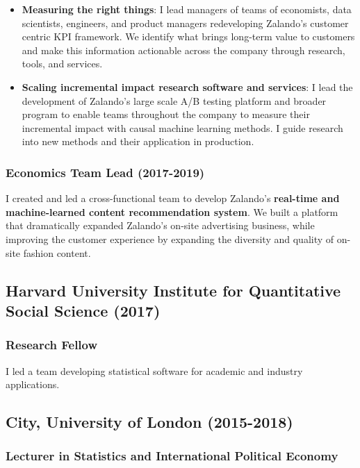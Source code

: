 \documentclass[a4paper]{article}
\begin{document}
\begin{itemize}

  \item \textbf{Measuring the right things}: I lead managers of teams of economists, data scientists, engineers, and product managers redeveloping Zalando's customer centric KPI framework. We identify what brings long-term value to customers and make this information actionable across the company through research, tools, and services.

  \item \textbf{Scaling incremental impact research software and services}: I lead the development of Zalando's large scale A/B testing platform and broader program to enable teams throughout the company to measure their incremental impact with causal machine learning methods. I guide research into new methods and their application in production.

\end{itemize}
  
\subsubsection*{Economics Team Lead (2017-2019)}

I created and led a cross-functional team to develop Zalando's \textbf{real-time and machine-learned content recommendation system}. We built a platform that dramatically expanded Zalando's on-site advertising business, while improving the customer experience by expanding the diversity and quality of on-site fashion content.

\subsection*{Harvard University Institute for Quantitative Social Science (2017)}

\subsubsection*{Research Fellow}

I led a team developing statistical software for academic and industry applications. 

\subsection*{City, University of London (2015-2018)}

\subsubsection*{Lecturer in Statistics and International Political Economy}
\end{document}
